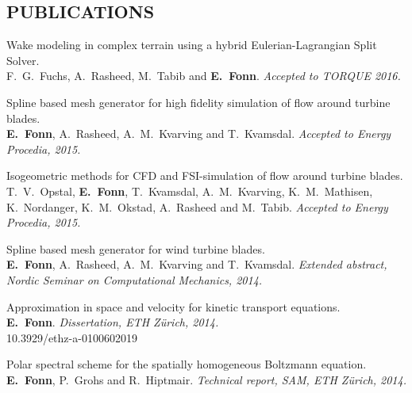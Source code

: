 \documentclass[line,margin]{res}
\newcommand{\zh}{Z\"{u}rich}
\begin{document}
\begin{resume}
\section{PUBLICATIONS}

Wake modeling in complex terrain using a hybrid Eulerian-Lagrangian Split Solver. \\
F.~G.~Fuchs, A.~Rasheed, M.~Tabib and {\bf E.~Fonn}.
{\em Accepted to TORQUE 2016.}

Spline based mesh generator for high fidelity simulation of flow around turbine blades. \\
{\bf E.~Fonn}, A.~Rasheed, A.~M.~Kvarving and T.~Kvamsdal.
{\em Accepted to Energy Procedia, 2015.}

Isogeometric methods for CFD and FSI-simulation of flow around turbine blades. \\
T.~V.~Opstal, {\bf E.~Fonn}, T.~Kvamsdal, A.~M.~Kvarving, K.~M.~Mathisen,
K.~Nordanger, K.~M.~Okstad, A.~Rasheed and M.~Tabib.
{\em Accepted to Energy Procedia, 2015.}




Spline based mesh generator for wind turbine blades. \\
{\bf E.~Fonn}, A.~Rasheed, A.~M.~Kvarving and T.~Kvamsdal.
{\em Extended abstract,  Nordic Seminar on Computational Mechanics, 2014.}

Approximation in space and velocity for kinetic transport equations. \\
{\bf E.~Fonn}.
{\em Dissertation, ETH \zh, 2014.} \\
10.3929/ethz-a-0100602019

Polar spectral scheme for the spatially homogeneous Boltzmann equation. \\
{\bf E.~Fonn}, P.~Grohs and R.~Hiptmair.
{\em Technical report, SAM, ETH \zh, 2014.}


\end{resume}
\end{document}

